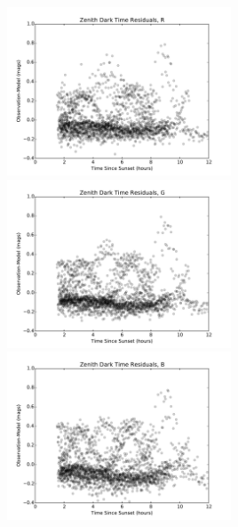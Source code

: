 \documentclass[]{spie}
\begin{document}
\begin{figure}
  \includegraphics[height=5cm]{plots/residTON_R.pdf}\includegraphics[height=5cm]{plots/residTON_G.pdf}\includegraphics[height=5cm]{plots/residTON_B.pdf} \\

\end{figure}
\end{document}
